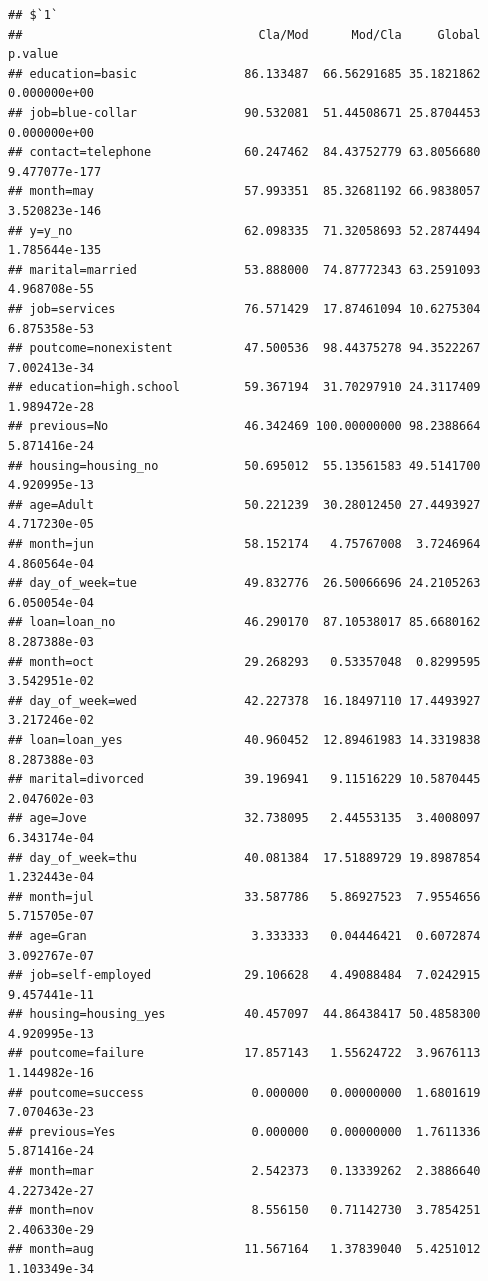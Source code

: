 \documentclass[
]{article}
\begin{document}
\begin{verbatim}
## $`1`
##                                 Cla/Mod      Mod/Cla     Global       p.value
## education=basic               86.133487  66.56291685 35.1821862  0.000000e+00
## job=blue-collar               90.532081  51.44508671 25.8704453  0.000000e+00
## contact=telephone             60.247462  84.43752779 63.8056680 9.477077e-177
## month=may                     57.993351  85.32681192 66.9838057 3.520823e-146
## y=y_no                        62.098335  71.32058693 52.2874494 1.785644e-135
## marital=married               53.888000  74.87772343 63.2591093  4.968708e-55
## job=services                  76.571429  17.87461094 10.6275304  6.875358e-53
## poutcome=nonexistent          47.500536  98.44375278 94.3522267  7.002413e-34
## education=high.school         59.367194  31.70297910 24.3117409  1.989472e-28
## previous=No                   46.342469 100.00000000 98.2388664  5.871416e-24
## housing=housing_no            50.695012  55.13561583 49.5141700  4.920995e-13
## age=Adult                     50.221239  30.28012450 27.4493927  4.717230e-05
## month=jun                     58.152174   4.75767008  3.7246964  4.860564e-04
## day_of_week=tue               49.832776  26.50066696 24.2105263  6.050054e-04
## loan=loan_no                  46.290170  87.10538017 85.6680162  8.287388e-03
## month=oct                     29.268293   0.53357048  0.8299595  3.542951e-02
## day_of_week=wed               42.227378  16.18497110 17.4493927  3.217246e-02
## loan=loan_yes                 40.960452  12.89461983 14.3319838  8.287388e-03
## marital=divorced              39.196941   9.11516229 10.5870445  2.047602e-03
## age=Jove                      32.738095   2.44553135  3.4008097  6.343174e-04
## day_of_week=thu               40.081384  17.51889729 19.8987854  1.232443e-04
## month=jul                     33.587786   5.86927523  7.9554656  5.715705e-07
## age=Gran                       3.333333   0.04446421  0.6072874  3.092767e-07
## job=self-employed             29.106628   4.49088484  7.0242915  9.457441e-11
## housing=housing_yes           40.457097  44.86438417 50.4858300  4.920995e-13
## poutcome=failure              17.857143   1.55624722  3.9676113  1.144982e-16
## poutcome=success               0.000000   0.00000000  1.6801619  7.070463e-23
## previous=Yes                   0.000000   0.00000000  1.7611336  5.871416e-24
## month=mar                      2.542373   0.13339262  2.3886640  4.227342e-27
## month=nov                      8.556150   0.71142730  3.7854251  2.406330e-29
## month=aug                     11.567164   1.37839040  5.4251012  1.103349e-34

\end{verbatim}
\end{document}
